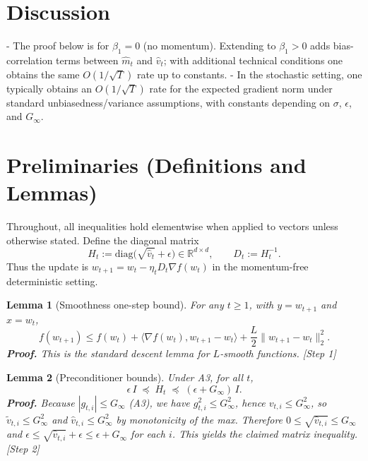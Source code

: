 \documentclass[11pt]{article}
\newtheorem{lemma}{Lemma}
\newcommand{\R}{\mathbb{R}}
\begin{document}
\section*{Discussion}
- The proof below is for $\beta_1=0$ (no momentum). Extending to $\beta_1>0$ adds bias-correlation terms between $\hat m_t$ and $\hat v_t$; with additional technical conditions one obtains the same $O(1/\sqrt{T})$ rate up to constants.
- In the stochastic setting, one typically obtains an $O(1/\sqrt{T})$ rate for the expected gradient norm under standard unbiasedness/variance assumptions, with constants depending on $\sigma$, $\epsilon$, and $G_\infty$.

\section*{Preliminaries (Definitions and Lemmas)}
Throughout, all inequalities hold elementwise when applied to vectors unless otherwise stated. Define the diagonal matrix
\[
H_t := \mathrm{diag}\big(\sqrt{\hat v_t} + \epsilon\big)\in\R^{d\times d},\qquad D_t := H_t^{-1}.
\]
Thus the update is $w_{t+1}=w_t - \eta_t D_t \nabla f(w_t)$ in the momentum-free deterministic setting.

\begin{lemma}[Smoothness one-step bound]
For any $t\ge 1$, with $y=w_{t+1}$ and $x=w_t$,
\[
f(w_{t+1}) \le f(w_t) + \langle \nabla f(w_t), w_{t+1}-w_t\rangle + \frac{L}{2}\|w_{t+1}-w_t\|_2^2.
\]
\textbf{Proof.} This is the standard descent lemma for $L$-smooth functions. [Step 1]
\end{lemma}

\begin{lemma}[Preconditioner bounds]
Under A3, for all $t$,
\[
\epsilon\, I \;\preceq\; H_t \;\preceq\; (\epsilon + G_\infty)\, I.
\]
\textbf{Proof.} Because $|g_{t,i}|\le G_\infty$ (A3), we have $g_{t,i}^2\le G_\infty^2$, hence $v_{t,i}\le G_\infty^2$, so $\tilde v_{t,i}\le G_\infty^2$ and $\hat v_{t,i}\le G_\infty^2$ by monotonicity of the max. Therefore $0\le \sqrt{\hat v_{t,i}} \le G_\infty$ and $\epsilon \le \sqrt{\hat v_{t,i}} + \epsilon \le \epsilon + G_\infty$ for each $i$. This yields the claimed matrix inequality. [Step 2]
\end{lemma}
\end{document}
